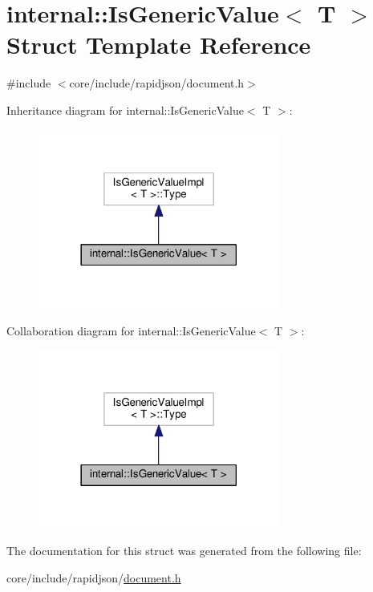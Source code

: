 \hypertarget{structinternal_1_1IsGenericValue}{}\section{internal\+:\+:Is\+Generic\+Value$<$ T $>$ Struct Template Reference}
\label{structinternal_1_1IsGenericValue}


{\ttfamily \#include $<$core/include/rapidjson/document.\+h$>$}



Inheritance diagram for internal\+:\+:Is\+Generic\+Value$<$ T $>$\+:
\nopagebreak
\begin{figure}[H]
\begin{center}
\leavevmode
\includegraphics[width=225pt]{structinternal_1_1IsGenericValue__inherit__graph}
\end{center}
\end{figure}


Collaboration diagram for internal\+:\+:Is\+Generic\+Value$<$ T $>$\+:
\nopagebreak
\begin{figure}[H]
\begin{center}
\leavevmode
\includegraphics[width=225pt]{structinternal_1_1IsGenericValue__coll__graph}
\end{center}
\end{figure}


The documentation for this struct was generated from the following file\+:\begin{DoxyCompactItemize}
\item 
core/include/rapidjson/\hyperlink{document_8h}{document.\+h}\end{DoxyCompactItemize}
